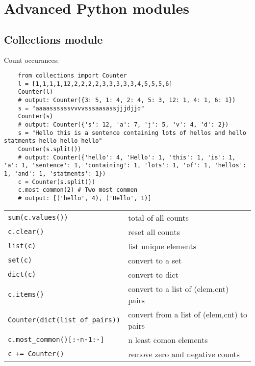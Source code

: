 \section{Advanced Python modules}

\subsection{Collections module}
Count occurances: 
\begin{verbatim}
    from collections import Counter 
    l = [1,1,1,1,12,2,2,2,2,3,3,3,3,3,4,5,5,5,6]
    Counter(l)
    # output: Counter({3: 5, 1: 4, 2: 4, 5: 3, 12: 1, 4: 1, 6: 1})
    s = "aaaassssssvvvvsssaasassjjjdjjd"
    Counter(s)
    # output: Counter({'s': 12, 'a': 7, 'j': 5, 'v': 4, 'd': 2})
    s = "Hello this is a sentence containing lots of hellos and hello statments hello hello hello"
    Counter(s.split())
    # output: Counter({'hello': 4, 'Hello': 1, 'this': 1, 'is': 1, 'a': 1, 'sentence': 1, 'containing': 1, 'lots': 1, 'of': 1, 'hellos': 1, 'and': 1, 'statments': 1})
    c = Counter(s.split())
    c.most_common(2) # Two most common
    # output: [('hello', 4), ('Hello', 1)]
\end{verbatim}

\begin{center}
    \begin{tabular}{ |p{8cm}|p{8cm}| }
        \hline
            \verb|sum(c.values())| & total of all counts \\
            \verb|c.clear()| & reset all counts \\ 
            \verb|list(c)| & list unique elements \\ 
            \verb|set(c)| & convert to a set \\ 
            \verb|dict(c)| & convert to dict \\ 
            \verb|c.items()| & convert to a list of (elem,cnt) pairs \\ 
            \verb|Counter(dict(list_of_pairs))| & convert from a list of (elem,cnt) to pairs \\ 
            \verb|c.most_common()[:-n-1:-]| & n least comon elements \\ 
            \verb|c += Counter()| & remove zero and negative counts \\ 
        \hline
    \end{tabular}
\end{center}



